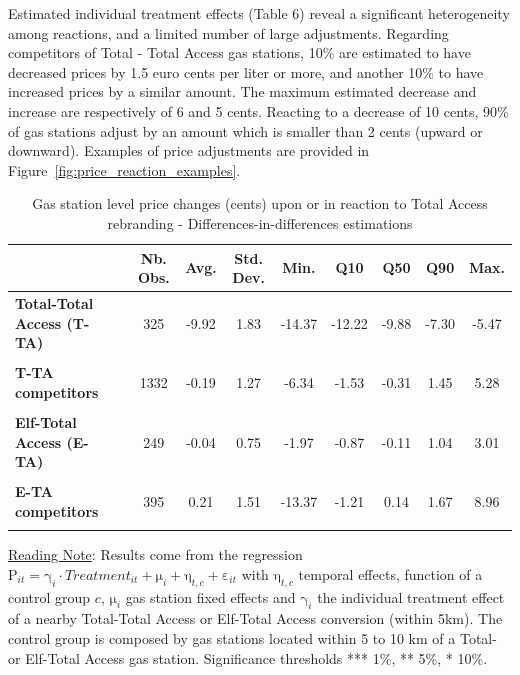 \documentclass[english]{article}
\begin{document}
Estimated individual treatment effects (Table 6) reveal a significant heterogeneity among reactions, and a limited number of large adjustments. Regarding competitors of Total - Total Access gas stations, 10\% are estimated to have decreased prices by 1.5 euro cents per liter or more, and another 10\% to have increased prices by a similar amount. The maximum estimated decrease and increase are respectively of 6 and 5 cents. Reacting to a decrease of 10 cents, 90\% of gas stations adjust by an amount which is smaller than 2 cents (upward or downward). Examples of price adjustments are provided in Figure~\ref{fig:price_reaction_examples}.

\begin{table}
\caption{Gas station level price changes (cents) upon or in reaction to Total Access rebranding - Differences-in-differences estimations}
\label{tab:gas_station_level_changes_dd_regs}
\begin{threeparttable}
\begin{footnotesize}
\begin{tabular}{llcccccccc}
\hline
\hline
 &  & \textbf{Nb. Obs.}  & \textbf{Avg.}  & \textbf{Std. Dev.}  & \textbf{Min.}  & \textbf{Q10}  & \textbf{Q50}  & \textbf{Q90}  & \textbf{Max.}\tabularnewline
\hline
\textbf{Total-Total Access (T-TA)}  &  & 325  & -9.92  & 1.83  & -14.37  & -12.22  & -9.88  & -7.30  & -5.47\tabularnewline
 &  &  &  &  &  &  &  &  & \tabularnewline
\textbf{T-TA competitors}  &  & 1332  & -0.19  & 1.27  & -6.34  & -1.53  & -0.31  & 1.45  & 5.28\tabularnewline
 &  &  &  &  &  &  &  &  & \tabularnewline
\hline
\textbf{Elf-Total Access (E-TA)}  &  & 249  & -0.04  & 0.75  & -1.97  & -0.87  & -0.11  & 1.04  & 3.01\tabularnewline
 &  &  &  &  &  &  &  &  & \tabularnewline
\textbf{E-TA competitors}  &  & 395  & 0.21  & 1.51  & -13.37  & -1.21  & 0.14  & 1.67  & 8.96\tabularnewline
 &  &  &  &  &  &  &  &  & \tabularnewline
\hline
\hline
\end{tabular}
\end{footnotesize}
\end{threeparttable}
\parbox{\textwidth}{\footnotesize%
\vspace{2eX} %
{\footnotesize{}\uline{Reading Note}}{\footnotesize{}:} Results come from the regression $\mathrm{P}_{it}=\mathrm{\gamma}_{i}\cdot Treatment_{it}+\mathrm{\mu}_{i}+\mathrm{\eta}_{t,c}+\mathrm{\varepsilon}_{it}$ with $\mathrm{\eta}_{t,c}$ temporal effects, function of a control group $c$, $\mathrm{\mu}_{i}$ gas station fixed effects and $\mathrm{\gamma}_{i}$ the individual treatment effect of a nearby Total-Total Access or Elf-Total Access conversion (within 5km). The control group is composed by gas stations located within 5 to 10 km of a Total- or Elf-Total Access gas station. Significance thresholds {*}{*}{*} 1\%, {*}{*} 5\%, {*} 10\%.}
\end{table}
\end{document}

